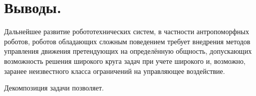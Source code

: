 
\section{Выводы.}
Дальнейшее развитие робототехнических систем, в частности антропоморфных роботов, роботов обладающих сложным поведением требует внедрения методов управления движения претендующих на определённую общность, допускающих возможность решения широкого круга задач при учете широкого и, возможно, заранее неизвестного класса ограничений на управляющее воздействие.

Декомпозиция задачи позволяет.
